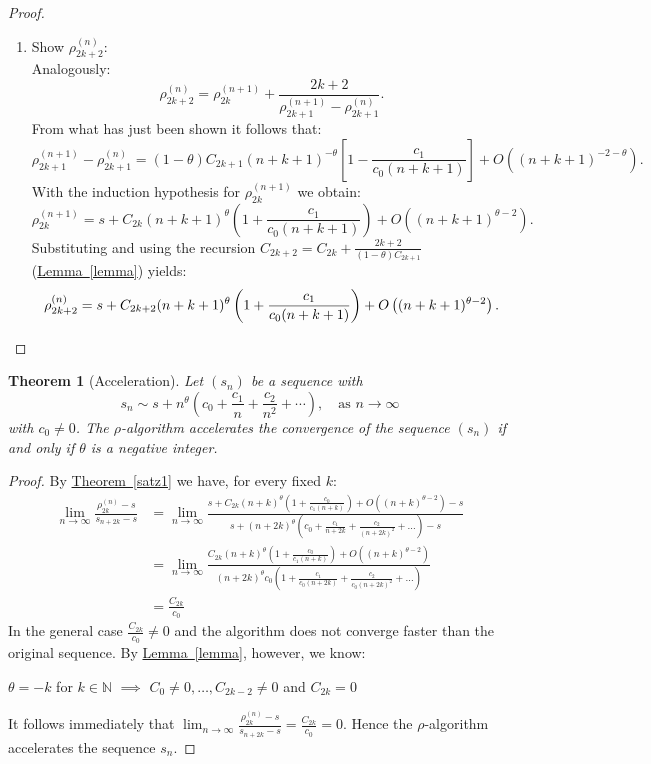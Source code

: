 \documentclass[a4paper,12pt]{article}
\numberwithin{equation}{section}
\newcommand{\lemref}[1]{\hyperref[#1]{Lemma~\ref*{#1}}}
\newcommand{\sref}[1]{\hyperref[#1]{Theorem~\ref*{#1}}}
\newtheorem{satz}{Theorem}[section]
\theoremstyle{remark}
\begin{document}
\begin{proof}
\begin{enumerate}
\item {Show \(\rho_{2k+2}^{(n)}\):} \\
Analogously:
\[
\rho_{2k+2}^{(n)} = \rho_{2k}^{(n+1)} + \frac{2k + 2}{\rho_{2k+1}^{(n+1)} - \rho_{2k+1}^{(n)}}.
\]
From what has just been shown it follows that:
\[
\rho_{2k+1}^{(n+1)} - \rho_{2k+1}^{(n)} = (1 - \theta) C_{2k+1} (n + k + 1)^{-\theta} \left[ 1 - \frac{c_1}{c_0 (n + k + 1)} \right] + O\left( (n + k + 1)^{-2 - \theta} \right).
\]
With the induction hypothesis for \(\rho_{2k}^{(n+1)}\) we obtain:
\[
\rho_{2k}^{(n+1)} = s + C_{2k} (n + k + 1)^{\theta} \left( 1 + \frac{c_1}{c_0 (n + k + 1)} \right) + O\left( (n + k + 1)^{\theta - 2} \right).
\]
Substituting and using the recursion \(C_{2k+2} = C_{2k} + \frac{2k + 2}{(1 - \theta) C_{2k+1}}\) (\lemref{lemma}) yields:
\[
\rho_{2k+2}^{(n)} = s + C_{2k+2} (n + k + 1)^{\theta} \left( 1 + \frac{c_1}{c_0 (n + k + 1)} \right) + O\left( (n + k + 1)^{\theta - 2} \right). \qedhere
\]
\end{enumerate}

\end{proof}




\begin{satz}[Acceleration]\label{satz2}
\textit{Let $(s_n)$ be a sequence with
\[
s_n \sim s + n^{\theta}(c_0 + \frac{c_1}{n} + \frac{c_2}{n^2} + \cdots), \quad \text{as } n \to \infty
\]
with $c_0 \ne 0$.
The $\rho$-algorithm accelerates the convergence of the sequence $(s_n)$ if and only if $\theta$ is a negative integer.}
\end{satz}

\begin{proof}
By \sref{satz1} we have, for every fixed $k$:
\begin{align*}
\lim_{n \to \infty} \frac{\rho_{2k}^{(n)} - s}{s_{n+2k} - s} &= \lim_{n \to \infty}\frac{s+C_{2k}(n+k)^{\theta}(1+\frac{c_0}{c_1(n+k)})+O((n+k)^{\theta-2})-s}{s+(n+2k)^\theta(c_0+\frac{c_1}{n+2k}+\frac{c_2}{(n+2k)^2}+\dots)-s}\\
&=\lim_{n \to \infty}\frac{C_{2k}(n+k)^{\theta}(1+\frac{c_0}{c_1(n+k)})+O((n+k)^{\theta-2})}{(n+2k)^\theta c_0(1+\frac{c_1}{c_0(n+2k)}+\frac{c_2}{c_0(n+2k)^2}+\dots)}\\
&=\frac{C_{2k}}{c_0}
\end{align*}
In the general case $\frac{C_{2k}}{c_0}\neq0$ and the algorithm does not converge faster than the original sequence. By \lemref{lemma}, however, we know:

\begin{center}
$\theta = -k$ for $k \in \mathbb{N}$ $\implies$ $C_0\ne0,\dots,C_{2k-2}\ne0$ and $C_{2k} = 0$
\end{center}
It follows immediately that $\lim_{n \to \infty} \frac{\rho_{2k}^{(n)} - s}{s_{n+2k} - s}=\frac{C_{2k}}{c_0}=0$. Hence the $\rho$-algorithm accelerates the sequence $s_n$.

\end{proof}
\end{document}
